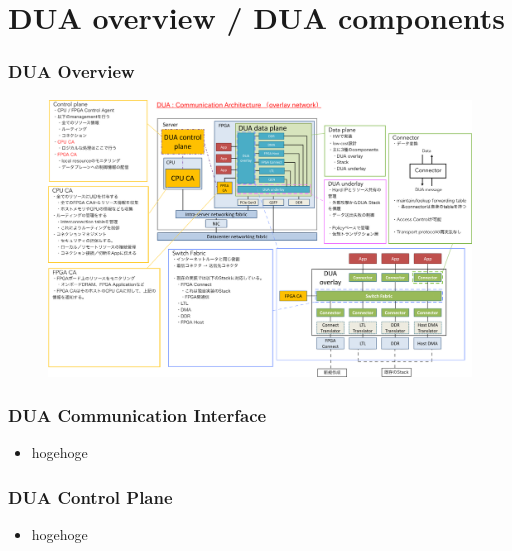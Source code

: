 \documentclass[dvipdfmx,9pt,notheorems]{beamer}
\theoremstyle{definition}
\begin{document}


\section{DUA overview / DUA components}
\begin{frame}\frametitle{DUA Overview}
  \begin{figure}[htb]
		\includegraphics[width=\linewidth]{fig/ez_DUA_high_overview.pdf}
  \end{figure}
\pnote{
}
\end{frame}



\begin{frame}\frametitle{DUA Communication Interface}
	\begin{itemize}
		\item hogehoge
	\end{itemize}
\pnote{
}
\end{frame}


\begin{frame}\frametitle{DUA Control Plane}
	\begin{itemize}
		\item hogehoge
	\end{itemize}
\pnote{
}
\end{frame}
\end{document}
